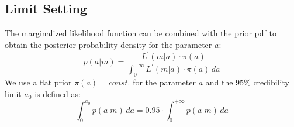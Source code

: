   \subsection{Limit Setting}
    The marginalized likelihood function can be combined with the prior pdf to obtain the posterior probability density for the parameter $a$:
    \begin{equation}
      p(a|m)=\frac{L^\prime(m|a)\cdot\pi(a)}{\int_0^{+\infty}{L^\prime(m|a)\cdot\pi(a)\,da}}
    \end{equation}
    We use a flat prior $\pi(a)=const.$ for the parameter $a$ and the $95\%$ credibility limit $a_0$ is defined as:
    \begin{equation}
      \int_0^{a_0}{p(a|m)\,da}=0.95\cdot\int_0^{+\infty}{p(a|m)\,da}
    \end{equation}

